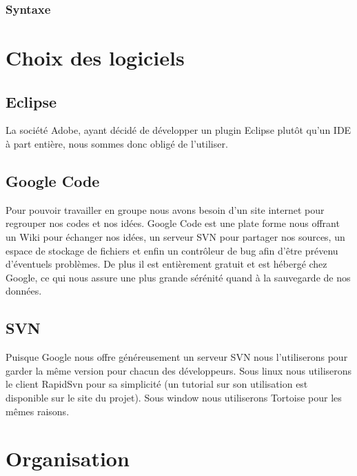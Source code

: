 \documentclass{article}
\begin{document}
		\subsubsection{Syntaxe}

\newpage

\section{Choix des logiciels}
	\subsection{Eclipse}
		La société Adobe, ayant décidé de développer un plugin Eclipse plutôt qu'un IDE à part entière, nous sommes donc obligé de l'utiliser.
	\subsection{Google Code}
		Pour pouvoir travailler en groupe nous avons besoin d'un site internet pour regrouper nos codes et nos idées. Google Code est une plate forme nous offrant un Wiki pour échanger nos idées, un serveur SVN pour partager nos sources, un espace de stockage de fichiers et enfin un contrôleur de bug afin d'être prévenu d'éventuels problèmes.
		\ident De plus il est entièrement gratuit et est hébergé chez Google, ce qui nous assure une plus grande sérénité quand à la sauvegarde de nos données.
	\subsection{SVN}
		Puisque Google nous offre généreusement un serveur SVN nous l'utiliserons pour garder la même version pour chacun des développeurs. 
		\ident Sous linux nous utiliserons le client RapidSvn pour sa simplicité (un tutorial sur son utilisation est disponible sur le site du projet).
		\ident Sous window nous utiliserons Tortoise pour les mêmes raisons.

\newpage

\section{Organisation}
\end{document}
